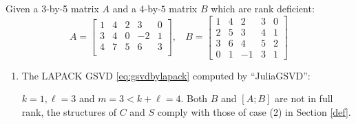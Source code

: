\newpage
\begin{example} \label{eg:case2b} 
{\rm 
Given a 3-by-5 matrix $A$ and a $4$-by-$5$ matrix $B$ which are rank deficient:
        \begin{displaymath}
            A = \begin{bmatrix}
                1 & 4 & 2 & 3 & 0\\
                3 & 4 & 0 & -2 & 1\\
                4 & 7 & 5 & 6 & 3\\
            \end{bmatrix}, \ \ \ \
            B = \begin{bmatrix}
                1 & 4 & 2 & 3 & 0\\
                2 & 5 & 3 & 4 & 1 \\
                3 & 6 & 4 & 5 & 2\\
                0 & 1 & -1 & 3 & 1
            \end{bmatrix}
        \end{displaymath}
    \begin{enumerate}[(1).]
        \item The LAPACK GSVD \eqref{eq:gsvdbylapack} computed by ``JuliaGSVD'': 
        
            $k = 1, \ell = 3$ and $m = 3 < k+\ell = 4$. Both $B$ and $[A; B]$ are not in full rank, the structures of $C$ and $S$ comply with those of case (2) in Section \ref{def}.
            

\end{enumerate}}
\end{example}
